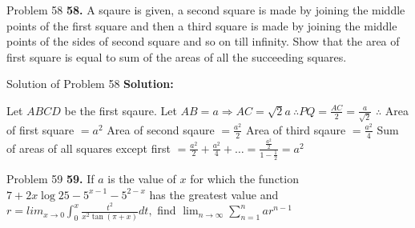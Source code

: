 \documentclass[aspectratio=1610,8pt]{beamer}
\begin{document}
\begin{frame}{Problem 58}
  \textbf{58.} A sqaure is given, a second square is made by joining the middle points of the first square and then a third square
  is made by joining the middle points of the sides of second square and so on till infinity. Show that the area of first square is
  equal to sum of the areas of all the succeeding squares.
\end{frame}
\begin{frame}{Solution of Problem 58}
  \textbf{Solution:}
  \begin{center}
  \end{center}
  Let $ABCD$ be the first sqaure. Let $AB = a \Rightarrow AC = \sqrt{2}a~\therefore PQ = \frac{AC}{2} = \frac{a}{\sqrt{2}}$
  \linebreak\linebreak
  $\therefore $ Area of first square $= a^2$
  \linebreak\linebreak
  Area of second sqaure $= \frac{a^2}{2}$
  \linebreak\linebreak
  Area of third sqaure $= \frac{a^2}{4}$
  \linebreak\linebreak
  Sum of areas of all squares except first $= \frac{a^2}{2} + \frac{a^2}{4} + \ldots = \frac{\frac{a^2}{2}}{1 - \frac{1}{2}} = a^2$
\end{frame}
\begin{frame}{Problem 59}
  \textbf{59.} If $a$ is the value of $x$ for which the function $7 + 2x\log 25 - 5^{x - 1} - 5^{2 - x}$ has the greatest value and
  $r = lim_{x\to 0}\int_{0}^x\frac{t^2}{x^2\tan(\pi + x)}dt,$ find $\lim_{n \to \infty}\sum_{n = 1}^nar^{n - 1}$
\end{frame}
\end{document}
